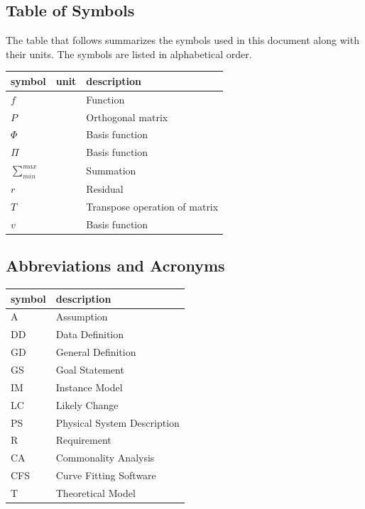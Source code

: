 \documentclass[12pt]{article}
\newcommand{\famname}{CFS} %
\begin{document}
\subsection{Table of Symbols}

The table that follows summarizes the symbols used in this document along with
their units. The symbols are listed in alphabetical order.

\renewcommand{\arraystretch}{1.2}
\noindent \begin{longtable*}{l l p{12cm}} \toprule
\textbf{symbol} & \textbf{unit} & \textbf{description}\\
\midrule 
$f$ & & Function\\
$P$ & & Orthogonal matrix\\
$\Phi$ & & Basis function\\
$\Pi$ & & Basis function\\
$\sum_{min}^{max}$& & Summation \\ 
$r$ & & Residual\\
$T$ & & Transpose operation of matrix\\
$v$ & & Basis function\\
\bottomrule
\end{longtable*}


\subsection{Abbreviations and Acronyms}

\renewcommand{\arraystretch}{1.2}
\begin{tabular}{l l} 
  \toprule		
  \textbf{symbol} & \textbf{description}\\
  \midrule 
  A & Assumption\\
  DD & Data Definition\\
  GD & General Definition\\
  GS & Goal Statement\\
  IM & Instance Model\\
  LC & Likely Change\\
  PS & Physical System Description\\
  R & Requirement\\
  CA & Commonality Analysis\\
  \famname & Curve Fitting Software\\
  T & Theoretical Model\\
  \bottomrule
\end{tabular}\\
\end{document}
